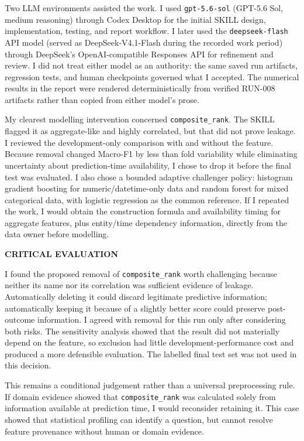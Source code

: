 \documentclass[10pt,a4paper,twocolumn]{article}
\begin{document}
Two LLM environments assisted the work. I used \texttt{gpt-5.6-sol} (GPT-5.6 Sol, medium reasoning) through Codex Desktop for the initial SKILL design, implementation, testing, and report workflow. I later used the \texttt{deepseek-flash} API model (served as DeepSeek-V4.1-Flash during the recorded work period) through DeepSeek's OpenAI-compatible Responses API for refinement and review. I did not treat either model as an authority: the same saved run artifacts, regression tests, and human checkpoints governed what I accepted. The numerical results in the report were rendered deterministically from verified RUN-008 artifacts rather than copied from either model's prose.

My clearest modelling intervention concerned \texttt{composite\_rank}. The SKILL flagged it as aggregate-like and highly correlated, but that did not prove leakage. I reviewed the development-only comparison with and without the feature. Because removal changed Macro-F1 by less than fold variability while eliminating uncertainty about prediction-time availability, I chose to drop it before the final test was evaluated. I also chose a bounded adaptive challenger policy: histogram gradient boosting for numeric/datetime-only data and random forest for mixed categorical data, with logistic regression as the common reference. If I repeated the work, I would obtain the construction formula and availability timing for aggregate features, plus entity/time dependency information, directly from the data owner before modelling.

\vspace{2pt}
{\noindent\fontsize{11}{13}\selectfont\bfseries\color{accent}CRITICAL EVALUATION\par}
\vspace{2pt}

I found the proposed removal of \texttt{composite\_rank} worth challenging because neither its name nor its correlation was sufficient evidence of leakage. Automatically deleting it could discard legitimate predictive information; automatically keeping it because of a slightly better score could preserve post-outcome information. I agreed with removal for this run only after considering both risks. The sensitivity analysis showed that the result did not materially depend on the feature, so exclusion had little development-performance cost and produced a more defensible evaluation. The labelled final test set was not used in this decision.

This remains a conditional judgement rather than a universal preprocessing rule. If domain evidence showed that \texttt{composite\_rank} was calculated solely from information available at prediction time, I would reconsider retaining it. This case showed that statistical profiling can identify a question, but cannot resolve feature provenance without human or domain evidence.
\end{document}
